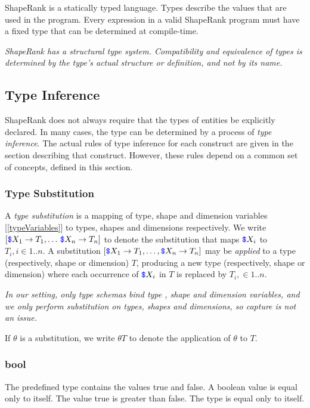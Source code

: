 \documentclass{article}
\begin{document}
{ShapeRank is a statically typed language. Types describe the values that are used in the program. Every expression in a valid ShapeRank program must have a fixed type that can be determined at compile-time.

{\em 
ShapeRank has a structural type system. Compatibility and equivalence of types is determined by the type's actual structure or definition, and not by  its name.
}

 \subsection{Type Inference}
  \label{typeInference}
  
 ShapeRank does not always require that the types of entities be explicitly declared.  In many cases, the type can be determined by a process of {\em type inference}. The actual rules of type inference for each construct are given in the section describing that construct. However, these rules depend on a common set of concepts, defined in this section.
 
  
  \subsubsection{Type Substitution}
  \label{typeSubstitution}
  
  A {\em type substitution} is a mapping of type, shape and dimension variables [\ref{typeVariables}] to types, shapes and dimensions respectively. We write $[\texttt{\color{blue} \$}{}X_1 \to T_1, \ldots\, \texttt{\color{blue} \$}{}X_n \to T_n]$ to denote the substitution that maps $\texttt{\color{blue} \$}{}X_i$ to $T_i, i \in 1..n$. A substitution $[\texttt{\color{blue} \$}{}X_1 \to T_1, \ldots, \texttt{\color{blue} \$}{}X_n \to T_n]$ may be {\em applied} to a type (respectively, shape or dimension) $T$, producing a new type (respectively, shape or dimension) where each occurrence of $\texttt{\color{blue} \$}{}X_i$ in $T$ is replaced by $T_i ,\in 1..n$.
  
  {\em 
  In our setting, only type schemas bind type , shape and dimension variables, and we only perform substitution on types, shapes and dimensions, so capture is not an issue.
  }
  
If $\theta$ is a substitution, we write $\theta T$ to denote the application of $\theta$ to $T$.

\subsubsection{bool}
\label{bool}

The predefined type \BOOL{} contains the values true and false.  A boolean value is equal only to itself. The value true is greater than false. The type \BOOL{} is equal only to itself.

}
\end{document}
